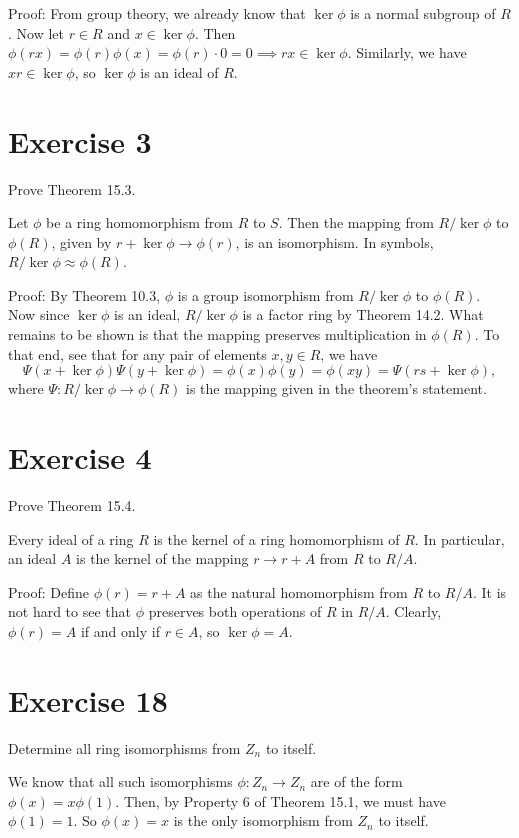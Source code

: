 \documentclass[12pt]{article}
\begin{document}
Proof: From group theory, we already know that $\ker\phi$ is
a normal subgroup of $R$.  Now let $r\in R$ and $x\in\ker\phi$.
Then $\phi(rx)=\phi(r)\phi(x)=\phi(r)\cdot 0=0\implies rx\in\ker\phi$.
Similarly, we have $xr\in\ker\phi$, so $\ker\phi$ is an ideal of $R$.

\section*{Exercise 3}

Prove Theorem 15.3.

Let $\phi$ be a ring homomorphism from $R$ to $S$.  Then the
mapping from $R/\ker\phi$ to $\phi(R)$, given by $r+\ker\phi\to\phi(r)$,
is an isomorphism.  In symbols, $R/\ker\phi\approx\phi(R)$.

Proof: By Theorem 10.3, $\phi$ is a group isomorphism from $R/\ker\phi$
to $\phi(R)$.  Now since $\ker\phi$ is an ideal, $R/\ker\phi$ is a factor ring
by Theorem 14.2.  What remains to be shown is that the mapping preserves
multiplication in $\phi(R)$.  To that end, see that for any pair of elements $x,y\in R$, we have
\begin{equation*}
\Psi(x+\ker\phi)\Psi(y+\ker\phi)=\phi(x)\phi(y)=\phi(xy)=\Psi(rs+\ker\phi),
\end{equation*}
where $\Psi:R/\ker\phi\to\phi(R)$ is the mapping given in the theorem's statement.

\section*{Exercise 4}

Prove Theorem 15.4.

Every ideal of a ring $R$ is the kernel of a ring homomorphism of $R$.
In particular, an ideal $A$ is the kernel of the mapping $r\to r+A$ from
$R$ to $R/A$.

Proof: Define $\phi(r)=r+A$ as the natural homomorphism from $R$ to $R/A$.
It is not hard to see that $\phi$ preserves both operations of $R$ in $R/A$.
Clearly, $\phi(r)=A$ if and only if $r\in A$, so $\ker\phi=A$.

\section*{Exercise 18}

Determine all ring isomorphisms from $Z_n$ to itself.

We know that all such isomorphisms $\phi:Z_n\to Z_n$ are of
the form $\phi(x)=x\phi(1)$.  Then, by Property 6 of Theorem
15.1, we must have $\phi(1)=1$.  So $\phi(x)=x$ is the
only isomorphism from $Z_n$ to itself.
\end{document}
